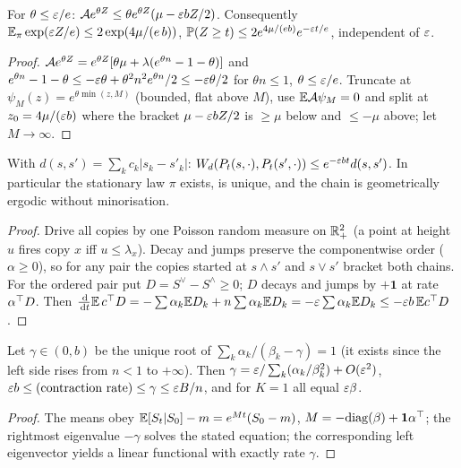 \begin{lemma}\label{lem:expmoment}\Pt{}
For $\theta\le\varepsilon/e$: $\mathcal A e^{\theta Z}\le\theta e^{\theta Z}(\mu-\varepsilon bZ/2)$. Consequently
$\mathbb{E}_\pi\exp(\varepsilon Z/e)\le2\exp(4\mu/(e\,b))$, $\mathbb{P}(Z\ge t)\le2e^{4\mu/(eb)}e^{-\varepsilon t/e}$, independent of $\varepsilon$.
\end{lemma}
\begin{proof}
$\mathcal A e^{\theta Z}=e^{\theta Z}[\theta\mu+\lambda(e^{\theta n}-1-\theta)]$ and $e^{\theta n}-1-\theta\le-\varepsilon\theta+\theta^2n^2e^{\theta n}/2\le-\varepsilon\theta/2$ for $\theta n\le1$, $\theta\le\varepsilon/e$.
Truncate at $\psi_M(z)=e^{\theta\min(z,M)}$ (bounded, flat above $M$), use $\mathbb{E}\mathcal A\psi_M=0$ and split at $z_0=4\mu/(\varepsilon b)$ where the bracket $\mu-\varepsilon bZ/2$ is $\ge\mu$ below and $\le-\mu$ above; let $M\to\infty$.
\end{proof}

\begin{theorem}\label{thm:contraction}\Pt{}
With $d(s,s')=\sum_kc_k|s_k-s'_k|$: $W_d(P_t(s,\cdot),P_t(s',\cdot))\le e^{-\varepsilon bt}d(s,s')$.
In particular the stationary law $\pi$ exists, is unique, and the chain is geometrically ergodic without minorisation.
\end{theorem}
\begin{proof}
Drive all copies by one Poisson random measure on $\mathbb{R}_+^2$ (a point at height $u$ fires copy $x$ iff $u\le\lambda_x$). Decay and jumps preserve the componentwise order ($\alpha\ge0$), so for any pair the copies started at $s\wedge s'$ and $s\vee s'$ bracket both chains. For the ordered pair put $D=S^\vee-S^\wedge\ge0$; $D$ decays and jumps by $+\mathbf1$ at rate $\alpha^{\top} D$. Then $\frac{\,\mathrm d}{\,\mathrm d t}\mathbb{E}\,c^{\top} D=-\sum\alpha_k\mathbb{E} D_k+n\sum\alpha_k\mathbb{E} D_k=-\varepsilon\sum\alpha_k\mathbb{E} D_k\le-\varepsilon b\,\mathbb{E} c^{\top} D$.
\end{proof}

\begin{proposition}\label{prop:gamma}\Pt{}
Let $\gamma\in(0,b)$ be the unique root of $\sum_k\alpha_k/(\beta_k-\gamma)=1$ (it exists since the left side rises from $n<1$ to $+\infty$). Then $\gamma=\varepsilon/\sum_k(\alpha_k/\beta_k^2)+O(\varepsilon^2)$,
$\varepsilon b\le(\text{contraction rate})\le\gamma\le\varepsilon B/n$, and for $K=1$ all equal $\varepsilon\beta$.
\end{proposition}
\begin{proof}
The means obey $\mathbb{E}[S_t|S_0]-m=e^{Mt}(S_0-m)$, $M=-\mathrm{diag}(\beta)+\mathbf1\alpha^{\top}$; the rightmost eigenvalue $-\gamma$ solves the stated equation; the corresponding left eigenvector yields a linear functional with exactly rate $\gamma$.
\end{proof}

